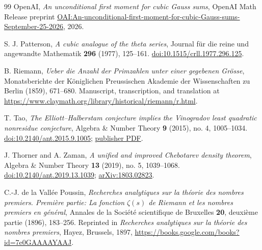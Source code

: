 \documentclass[11pt,a4paper]{article}
\numberwithin{equation}{section}
\numberwithin{figure}{section}
\theoremstyle{definition}
\theoremstyle{remark}
\begin{document}
\begin{thebibliography}{99}
OpenAI,
\emph{An unconditional first moment for cubic Gauss sums},
OpenAI Math Release preprint
\href{https://github.com/openai/math/blob/main/preprints/An-unconditional-first-moment-for-cubic-Gauss-sums-September-25-2026/paper.pdf}{OAI:An-unconditional-first-moment-for-cubic-Gauss-sums-September-25-2026},
2026.

S. J. Patterson,
\emph{A cubic analogue of the theta series},
Journal f\"ur die reine und angewandte Mathematik \textbf{296} (1977),
125--161.
\href{https://doi.org/10.1515/crll.1977.296.125}{doi:10.1515/crll.1977.296.125}.

B. Riemann,
\emph{Ueber die Anzahl der Primzahlen unter einer gegebenen Gr\"osse},
Monatsberichte der K\"oniglichen Preussischen Akademie der Wissenschaften
zu Berlin (1859), 671--680.
Manuscript, transcription, and translation at
\url{https://www.claymath.org/library/historical/riemann/r.html}.

T. Tao,
\emph{The Elliott--Halberstam conjecture implies the Vinogradov least
quadratic nonresidue conjecture},
Algebra \& Number Theory \textbf{9} (2015), no. 4, 1005--1034.
\href{https://doi.org/10.2140/ant.2015.9.1005}{doi:10.2140/ant.2015.9.1005};
\href{https://msp.org/ant/2015/9-4/ant-v9-n4-p09-p.pdf}{publisher PDF}.

J. Thorner and A. Zaman,
\emph{A unified and improved Chebotarev density theorem},
Algebra \& Number Theory \textbf{13} (2019), no. 5, 1039--1068.
\href{https://doi.org/10.2140/ant.2019.13.1039}{doi:10.2140/ant.2019.13.1039};
\href{https://arxiv.org/abs/1803.02823}{arXiv:1803.02823}.

C.-J. de la Vall\'ee Poussin,
\emph{Recherches analytiques sur la th\'eorie des nombres premiers.
Premi\`ere partie: La fonction $\zeta(s)$ de Riemann et les nombres
premiers en g\'en\'eral},
Annales de la Soci\'et\'e scientifique de Bruxelles \textbf{20},
deuxi\`eme partie (1896), 183--256.
Reprinted in \emph{Recherches analytiques sur la th\'eorie des nombres
premiers}, Hayez, Brussels, 1897,
\url{https://books.google.com/books?id=7e0GAAAAYAAJ}.

\end{thebibliography}
\end{document}
